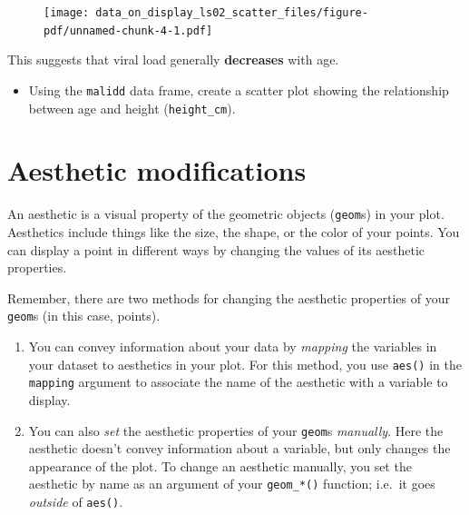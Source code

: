 \documentclass[
  letterpaper,
  DIV=11,
  numbers=noendperiod]{scrreprt}
\providecommand{\tightlist}{%
  \setlength{\itemsep}{0pt}\setlength{\parskip}{0pt}}\usepackage{longtable,booktabs,array}
\begin{document}
\begin{figure}[H]

{\centering \texttt{[image: data\_on\_display\_ls02\_scatter\_files/figure-pdf/unnamed-chunk-4-1.pdf]}

}

\end{figure}

This suggests that viral load generally \textbf{decreases} with age.

\begin{tcolorbox}[enhanced jigsaw, colframe=quarto-callout-tip-color-frame, colbacktitle=quarto-callout-tip-color!10!white, titlerule=0mm, opacitybacktitle=0.6, breakable, toprule=.15mm, arc=.35mm, rightrule=.15mm, colback=white, bottomrule=.15mm, opacityback=0, toptitle=1mm, left=2mm, bottomtitle=1mm, title=\textcolor{quarto-callout-tip-color}{\faLightbulb}\hspace{0.5em}{Practice}, leftrule=.75mm, coltitle=black]

\begin{itemize}
\tightlist
\item
  Using the \texttt{malidd} data frame, create a scatter plot showing
  the relationship between age and height (\texttt{height\_cm}).
\end{itemize}

\end{tcolorbox}

\hypertarget{aesthetic-modifications}{%
\section{Aesthetic modifications}\label{aesthetic-modifications}}

An aesthetic is a visual property of the geometric objects
(\texttt{geom}s) in your plot. Aesthetics include things like the size,
the shape, or the color of your points. You can display a point in
different ways by changing the values of its aesthetic properties.

Remember, there are two methods for changing the aesthetic properties of
your \texttt{geom}s (in this case, points).

\begin{enumerate}
\def\labelenumi{\arabic{enumi}.}
\item
  You can convey information about your data by \emph{mapping} the
  variables in your dataset to aesthetics in your plot. For this method,
  you use \texttt{aes()} in the \texttt{mapping} argument to associate
  the name of the aesthetic with a variable to display.
\item
  You can also \emph{set} the aesthetic properties of your
  \texttt{geom}s \emph{manually}. Here the aesthetic doesn't convey
  information about a variable, but only changes the appearance of the
  plot. To change an aesthetic manually, you set the aesthetic by name
  as an argument of your \texttt{geom\_*()} function; i.e.~it goes
  \emph{outside} of \texttt{aes()}.
\end{enumerate}
\end{document}
